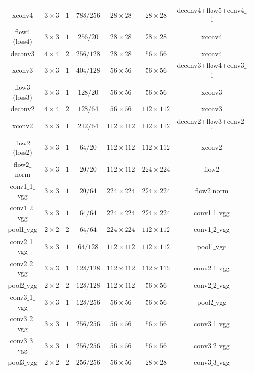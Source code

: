 \documentclass[sigconf]{acmart}
\begin{document}
\begin{table}[t]
\begin{center}
{\begin{tabular}{ | c | c | c | c | c | c |  c |}
					xconv4  & $3\times3$ & $1$ & $788/256$ & $28\times28$ & $28\times28$ & deconv4+flow5+conv4$\_$1 \\
					flow4 (loss4) & $3\times3$ & $1$ & $256/20$ & $28\times28$ & $28\times28$ & xconv4 \\
					deconv3 & $4\times4$ & $2$ & $256/128$ & $28\times28$ & $56\times56$ & xconv4 \\
					xconv3  & $3\times3$ & $1$ & $404/128$ & $56\times56$ & $56\times56$ & deconv3+flow4+conv3$\_$1 \\
					flow3 (loss3) & $3\times3$ & $1$ & $128/20$ & $56\times56$ & $56\times56$ & xconv3 \\
					deconv2 & $4\times4$ & $2$ & $128/64$ & $56\times56$ & $112\times112$ & xconv3 \\
					xconv2  & $3\times3$ & $1$ & $212/64$ & $112\times112$ & $112\times112$ & deconv2+flow3+conv2$\_$1 \\
					flow2 (loss2) & $3\times3$ & $1$ & $64/20$ & $112\times112$ & $112\times112$ & xconv2 \\
					\hline
					flow2$\_$norm & $3\times3$ & $1$ & $20/20$ & $112\times112$ & $224\times224$ & flow2 \\
					conv1$\_$1$\_$vgg & $3\times3$ & $1$ & $20/64$ & $224\times224$ & $224\times224$ & flow2$\_$norm \\
					conv1$\_$2$\_$vgg & $3\times3$ & $1$ & $64/64$ & $224\times224$ & $224\times224$ & conv1$\_$1$\_$vgg \\
					pool1$\_$vgg & $2\times2$ & $2$ & $64/64$ & $224\times224$ & $112\times112$ & conv1$\_$2$\_$vgg \\
					conv2$\_$1$\_$vgg & $3\times3$ & $1$ & $64/128$ & $112\times112$ & $112\times112$ & pool1$\_$vgg \\
					conv2$\_$2$\_$vgg & $3\times3$ & $1$ & $128/128$ & $112\times112$ & $112\times112$ & conv2$\_$1$\_$vgg \\
					pool2$\_$vgg & $2\times2$ & $2$ & $128/128$ & $112\times112$ & $56\times56$ & conv2$\_$2$\_$vgg \\
					conv3$\_$1$\_$vgg & $3\times3$ & $1$ & $128/256$ & $56\times56$ & $56\times56$ & pool2$\_$vgg \\
					conv3$\_$2$\_$vgg & $3\times3$ & $1$ & $256/256$ & $56\times56$ & $56\times56$ & conv3$\_$1$\_$vgg \\
					conv3$\_$3$\_$vgg & $3\times3$ & $1$ & $256/256$ & $56\times56$ & $56\times56$ & conv3$\_$2$\_$vgg \\
					pool3$\_$vgg & $2\times2$ & $2$ & $256/256$ & $56\times56$ & $28\times28$ & conv3$\_$3$\_$vgg \\

\end{tabular}}
\end{center}
\end{table}
\end{document}
